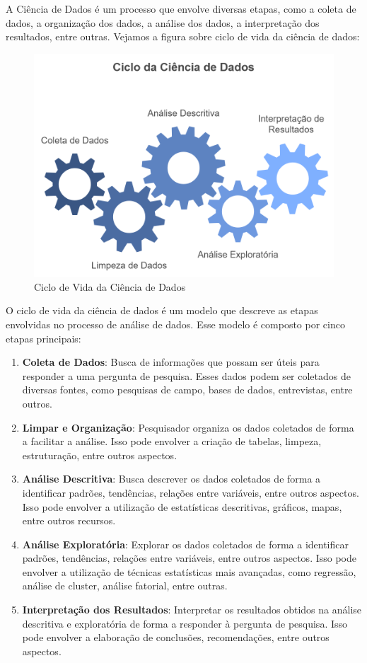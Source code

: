 \documentclass[
  letterpaper,
  DIV=11,
  numbers=noendperiod]{scrreprt}
\begin{document}
A Ciência de Dados é um processo que envolve diversas etapas, como a
coleta de dados, a organização dos dados, a análise dos dados, a
interpretação dos resultados, entre outras. Vejamos a figura sobre ciclo
de vida da ciência de dados:

\begin{figure}[H]

{\centering \includegraphics[width=0.7\linewidth,height=\textheight,keepaspectratio]{figuras/cicloDS.png}

}

\caption{Ciclo de Vida da Ciência de Dados}

\end{figure}%

O ciclo de vida da ciência de dados é um modelo que descreve as etapas
envolvidas no processo de análise de dados. Esse modelo é composto por
cinco etapas principais:

\begin{enumerate}
\def\labelenumi{\arabic{enumi}.}
\item
  \textbf{Coleta de Dados}: Busca de informações que possam ser úteis
  para responder a uma pergunta de pesquisa. Esses dados podem ser
  coletados de diversas fontes, como pesquisas de campo, bases de dados,
  entrevistas, entre outros.
\item
  \textbf{Limpar e Organização}: Pesquisador organiza os dados coletados
  de forma a facilitar a análise. Isso pode envolver a criação de
  tabelas, limpeza, estruturação, entre outros aspectos.
\item
  \textbf{Análise Descritiva}: Busca descrever os dados coletados de
  forma a identificar padrões, tendências, relações entre variáveis,
  entre outros aspectos. Isso pode envolver a utilização de estatísticas
  descritivas, gráficos, mapas, entre outros recursos.
\item
  \textbf{Análise Exploratória}: Explorar os dados coletados de forma a
  identificar padrões, tendências, relações entre variáveis, entre
  outros aspectos. Isso pode envolver a utilização de técnicas
  estatísticas mais avançadas, como regressão, análise de cluster,
  análise fatorial, entre outras.
\item
  \textbf{Interpretação dos Resultados}: Interpretar os resultados
  obtidos na análise descritiva e exploratória de forma a responder à
  pergunta de pesquisa. Isso pode envolver a elaboração de conclusões,
  recomendações, entre outros aspectos.
\end{enumerate}
\end{document}

